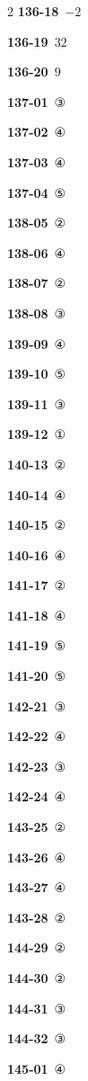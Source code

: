 \documentclass[10pt,a4paper]{article}
\begin{document}
\begin{multicols}{2}
\noindent\textbf{136-18}\ $-2$\par
\noindent\textbf{136-19}\ $32$\par
\noindent\textbf{136-20}\ $9$\par
\noindent\textbf{137-01}\ ③\par
\noindent\textbf{137-02}\ ④\par
\noindent\textbf{137-03}\ ④\par
\noindent\textbf{137-04}\ ⑤\par
\noindent\textbf{138-05}\ ②\par
\noindent\textbf{138-06}\ ④\par
\noindent\textbf{138-07}\ ②\par
\noindent\textbf{138-08}\ ③\par
\noindent\textbf{139-09}\ ④\par
\noindent\textbf{139-10}\ ⑤\par
\noindent\textbf{139-11}\ ③\par
\noindent\textbf{139-12}\ ①\par
\noindent\textbf{140-13}\ ②\par
\noindent\textbf{140-14}\ ④\par
\noindent\textbf{140-15}\ ②\par
\noindent\textbf{140-16}\ ④\par
\noindent\textbf{141-17}\ ②\par
\noindent\textbf{141-18}\ ④\par
\noindent\textbf{141-19}\ ⑤\par
\noindent\textbf{141-20}\ ⑤\par
\noindent\textbf{142-21}\ ③\par
\noindent\textbf{142-22}\ ④\par
\noindent\textbf{142-23}\ ③\par
\noindent\textbf{142-24}\ ④\par
\noindent\textbf{143-25}\ ②\par
\noindent\textbf{143-26}\ ④\par
\noindent\textbf{143-27}\ ④\par
\noindent\textbf{143-28}\ ②\par
\noindent\textbf{144-29}\ ②\par
\noindent\textbf{144-30}\ ②\par
\noindent\textbf{144-31}\ ③\par
\noindent\textbf{144-32}\ ③\par
\noindent\textbf{145-01}\ ④\par

\end{multicols}
\end{document}
